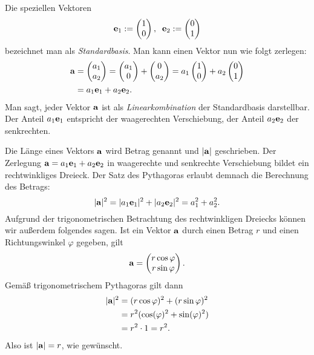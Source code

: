 Die speziellen Vektoren
\begin{equation}
\mathbf{e}_1 := \begin{pmatrix}1\\ 0\end{pmatrix},\;\;
\mathbf{e}_2 := \begin{pmatrix}0\\ 1\end{pmatrix}
\end{equation}
bezeichnet man als \emph{Standardbasis}. Man kann einen
Vektor nun wie folgt zerlegen:%
\begin{align*}
\mathbf{a} &= \begin{pmatrix}a_1\\ a_2\end{pmatrix}
= \begin{pmatrix}a_1\\ 0\end{pmatrix}
+ \begin{pmatrix}0\\ a_2\end{pmatrix}
= a_1\begin{pmatrix}1\\ 0\end{pmatrix}
+ a_2\begin{pmatrix}0\\ 1\end{pmatrix}\\
&= a_1\mathbf{e}_1+a_2\mathbf{e}_2.
\end{align*}
Man sagt, jeder Vektor $\mathbf{a}$ ist als \emph{Linearkombination}
der Standardbasis darstellbar. Der Anteil $a_1\mathbf{e}_1$
entspricht der waagerechten Verschiebung, der Anteil
$a_2\mathbf{e}_2$ der senkrechten.

Die Länge eines Vektors $\mathbf{a}$ wird Betrag
genannt und $|\mathbf{a}|$ geschrieben. Der Zerlegung
$\mathbf{a}=a_1\mathbf{e}_1+a_2\mathbf{e}_2$ in waagerechte und
senkrechte Verschiebung bildet ein rechtwinkliges Dreieck. Der Satz des
Pythagoras erlaubt demnach die Berechnung des Betrags:%
\begin{equation}
|\mathbf{a}|^2 = |a_1\mathbf{e}_1|^2+|a_2\mathbf{e}_2|^2 = a_1^2+a_2^2.
\end{equation}
Aufgrund der trigonometrischen Betrachtung des rechtwinkligen
Dreiecks können wir außerdem folgendes sagen. Ist ein Vektor $\mathbf{a}$
durch einen Betrag $r$ und einen Richtungswinkel $\varphi$ gegeben,
gilt%
\begin{equation}
\mathbf{a} = \begin{pmatrix}
r\cos\varphi\\
r\sin\varphi
\end{pmatrix}.
\end{equation}
Gemäß trigonometrischem Pythagoras gilt dann%
\begin{align*}
|\mathbf{a}|^2 &= (r\cos\varphi)^2+(r\sin\varphi)^2\\
&= r^2(\cos(\varphi)^2+\sin(\varphi)^2)\\
&= r^2\cdot 1 = r^2.
\end{align*}
Also ist $|\mathbf{a}|=r$, wie gewünscht.

